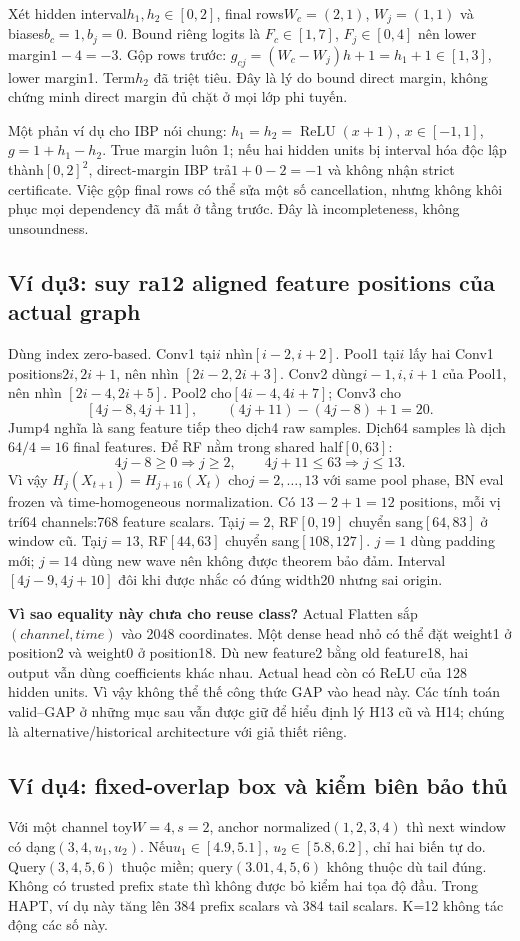 \documentclass[11pt,a4paper]{article}
\newcommand{\relu}{\operatorname{ReLU}}
\theoremstyle{definition}
\begin{document}
Xét hidden interval$h_1,h_2\in[0,2]$, final rows$W_c=(2,1)$,
$W_j=(1,1)$ và biases$b_c=1,b_j=0$. Bound riêng logits là
$F_c\in[1,7]$, $F_j\in[0,4]$ nên lower margin$1-4=-3$.
Gộp rows trước: $g_{cj}=(W_c-W_j)h+1=h_1+1\in[1,3]$,
lower margin1. Term$h_2$ đã triệt tiêu. Đây là lý do bound direct margin,
không chứng minh direct margin đủ chặt ở mọi lớp phi tuyến.

Một phản ví dụ cho IBP nói chung: $h_1=h_2=\relu(x+1)$,
$x\in[-1,1]$, $g=1+h_1-h_2$. True margin luôn 1; nếu hai hidden units bị interval hóa độc lập
thành$[0,2]^2$, direct-margin IBP trả$1+0-2=-1$ và không nhận strict certificate.
Việc gộp final rows có thể sửa một số cancellation, nhưng không khôi phục
mọi dependency đã mất ở tầng trước. Đây là incompleteness, không unsoundness.

\subsection*{Ví dụ3: suy ra12 aligned feature positions của actual graph}
Dùng index zero-based. Conv1 tại$i$ nhìn$[i-2,i+2]$.
Pool1 tại$i$ lấy hai Conv1 positions$2i,2i+1$, nên nhìn
$[2i-2,2i+3]$. Conv2 dùng$i-1,i,i+1$ của Pool1, nên nhìn
$[2i-4,2i+5]$. Pool2 cho$[4i-4,4i+7]$; Conv3 cho
\[
 [4j-8,4j+11],\qquad (4j+11)-(4j-8)+1=20.
\]
Jump4 nghĩa là sang feature tiếp theo dịch4 raw samples. Dịch64 samples
là dịch$64/4=16$ final features. Để RF nằm trong shared half$[0,63]$:
\[
 4j-8\ge0\Rightarrow j\ge2,\qquad
 4j+11\le63\Rightarrow j\le13.
\]
Vì vậy $H_j(X_{t+1})=H_{j+16}(X_t)$ cho$j=2,\ldots,13$ với same
pool phase, BN eval frozen và time-homogeneous normalization. Có
$13-2+1=12$ positions, mỗi vị trí64 channels:768 feature scalars.
Tại$j=2$, RF$[0,19]$ chuyển sang$[64,83]$ ở window cũ.
Tại$j=13$, RF$[44,63]$ chuyển sang$[108,127]$.
$j=1$ dùng padding mới; $j=14$ dùng new wave nên không được theorem bảo đảm.
Interval$[4j-9,4j+10]$ đôi khi được nhắc có đúng width20 nhưng sai origin.

\textbf{Vì sao equality này chưa cho reuse class?} Actual Flatten sắp
$(channel,time)$ vào 2048 coordinates. Một dense head nhỏ có thể đặt weight1
ở position2 và weight0 ở position18. Dù new feature2 bằng old feature18,
hai output vẫn dùng coefficients khác nhau. Actual head còn có ReLU của
128 hidden units. Vì vậy không thể thế công thức GAP vào head này.
Các tính toán valid--GAP ở những mục sau vẫn được giữ để hiểu định lý H13
cũ và H14; chúng là alternative/historical architecture với giả thiết riêng.

\subsection*{Ví dụ4: fixed-overlap box và kiểm biên bảo thủ}
Với một channel toy$W=4,s=2$, anchor normalized$(1,2,3,4)$ thì next
window có dạng$(3,4,u_1,u_2)$. Nếu$u_1\in[4.9,5.1]$,
$u_2\in[5.8,6.2]$, chỉ hai biến tự do. Query$(3,4,5,6)$ thuộc miền;
query$(3.01,4,5,6)$ không thuộc dù tail đúng. Không có trusted prefix state
thì không được bỏ kiểm hai tọa độ đầu. Trong HAPT, ví dụ này tăng lên 384
prefix scalars và 384 tail scalars. K=12 không tác động các số này.
\end{document}
